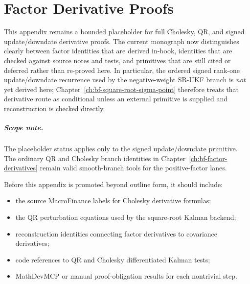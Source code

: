 \chapter{Factor Derivative Proofs}
\label{app:bf-factor-derivative-proofs}

This appendix remains a bounded placeholder for full Cholesky, QR, and signed update/downdate derivative proofs. The current monograph now distinguishes clearly between factor identities that are derived in-book, identities that are checked against source notes and tests, and primitives that are still cited or deferred rather than re-proved here. In particular, the ordered signed rank-one update/downdate recurrence used by the negative-weight SR-UKF branch is \emph{not} yet derived here; Chapter~\ref{ch:bf-square-root-sigma-point} therefore treats that derivative route as conditional unless an external primitive is supplied and reconstruction is checked directly.

\paragraph{Scope note.}
The placeholder status applies only to the signed update/downdate primitive. The ordinary QR and Cholesky branch identities in Chapter~\ref{ch:bf-factor-derivatives} remain valid smooth-branch tools for the positive-factor lanes.

Before this appendix is promoted beyond outline form, it should include:
\begin{itemize}
  \item the source MacroFinance labels for Cholesky derivative formulas;
  \item the QR perturbation equations used by the square-root Kalman backend;
  \item reconstruction identities connecting factor derivatives to covariance
    derivatives;
  \item code references to QR and Cholesky differentiated Kalman tests;
  \item MathDevMCP or manual proof-obligation results for each nontrivial step.
\end{itemize}
